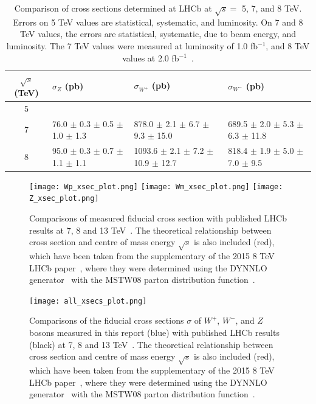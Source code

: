\documentclass[a4paper]{article}
\begin{document}
\begin{table}[]
    \centering
    \footnotesize
    \begin{tabular}{c|lll}
        \hline
         $\sqrt{s}$ (TeV)   &  $\sigma_{Z}$ (pb) &  $\sigma_{W^+}$ (pb) &  $\sigma_{W^-}$ (pb)  \\
        \hline
         5              &    &   &  \\
         7              &  76.0 $\pm$ 0.3 $\pm$ 0.5 $\pm$ 1.0 $\pm$ 1.3 &  878.0 $\pm$ 2.1 $\pm$ 6.7 $\pm$ 9.3 $\pm$ 15.0 &  689.5 $\pm$ 2.0 $\pm$ 5.3 $\pm$ 6.3 $\pm$ 11.8\\
         8              &  95.0 $\pm$ 0.3 $\pm$ 0.7 $\pm$ 1.1 $\pm$ 1.1 &  1093.6 $\pm$ 2.1 $\pm$ 7.2 $\pm$ 10.9 $\pm$ 12.7 &  818.4 $\pm$ 1.9 $\pm$ 5.0 $\pm$ 7.0 $\pm$ 9.5\\
         \hline
    \end{tabular}
    \caption{\small Comparison of cross sections determined at LHCb at $\sqrt{s} =$ 5, 7, and 8 TeV. Errors on 5 TeV values are statistical, systematic, and luminosity. On 7 and 8 TeV values, the errors are statistical, systematic, due to beam energy, and luminosity. The 7 TeV values were measured at luminosity of 1.0 fb$^{-1}$, and 8 TeV values at 2.0 fb$^{-1}$~\cite{7TeV_Z_2015,8TeV_W+Z_2015}.}
    \label{tab: xsec comparison}
\end{table}

\begin{figure}[t]
\centering
\texttt{[image: Wp\_xsec\_plot.png]}
\texttt{[image: Wm\_xsec\_plot.png]}
\texttt{[image: Z\_xsec\_plot.png]}
\vspace{-4mm}
\caption{\small Comparisons of measured fiducial cross section with published LHCb results at 7, 8 and 13 TeV~\cite{7TeV_Z_2015,8TeV_W+Z_2015,13TeV_Z_2016}. The theoretical relationship between cross section and centre of mass energy $\sqrt{s}$ is also included (red), which have been taken from the supplementary of the 2015 8 TeV LHCb paper~\cite{8TeV_W+Z_2015}, where they were determined using the DYNNLO generator~\cite{DYNNLO} with the MSTW08 parton distribution function~\cite{MSTW08}.}
\label{fig: xsec comparison}
\end{figure}

\begin{figure}
\centering
\texttt{[image: all\_xsecs\_plot.png]}
\vspace{-3mm}
\caption{\small Comparisons of the fiducial cross sections $\sigma$ of $W^+$, $W^-$, and $Z$ bosons measured in this report (blue) with published LHCb results (black) at 7, 8 and 13 TeV~\cite{7TeV_Z_2015,8TeV_W+Z_2015,13TeV_Z_2016}. The theoretical relationship between cross section and centre of mass energy $\sqrt{s}$ is also included (red), which have been taken from the supplementary of the 2015 8 TeV LHCb paper~\cite{8TeV_W+Z_2015}, where they were determined using the DYNNLO generator~\cite{DYNNLO} with the MSTW08 parton distribution function~\cite{MSTW08}.}
\label{fig: all xsec comparison}
\end{figure}
\end{document}
